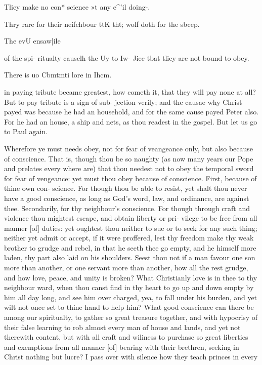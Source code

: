 \documentclass{custom}
\begin{document}
{Tliey make 
no con* 
science »t 
any e^'il 
doing-. 

Thry rare 
for their 
neifchbour 
ttK tht; wolf 
doth for 
the sbcep. 

The evU 
ensaw|ile 

of the spi- 
ritualty 
causclh the 
Uy to Iw- 
Jie\-e tbat 
tliey arc 
not bound 
to obey. 

There is uo 
Cbmtmti 
lore in 
Ihcm. 

in paying tribute became greatest, how cometh it, that they 
will pay none at all? But to pay tribute is a sign of sub- 
jection verily; and the causae why Christ payed was because 
he had an household, and for the same cause payed Peter 
also. For he had an house, a ship and nets, as thou readest 
in the gospel. But let us go to Paul again. 

Wherefore ye must needs obey, not for fear of veangeance 
only, but also because of conscience. That is, though 
thou be so naughty (as now many years our Pope and 
prelates every where are) that thou needest not to obey the 
temporal sword for fear of vengeance: yet must thou obey 
because of conscience. First, because of thine own con- 
science. For though thou be able to resist, yet shalt thou 
never have a good conscience, as long as God's word, law,
and ordinance, are against thee. Secondarily, for thy 
neighbour's conscience. For though through craft and 
violence thou mightest escape, and obtain liberty or pri- 
vilege to be free from all manner [of] duties: yet oughtest 
thou neither to sue or to seek for any such thing; neither 
yet admit or accept, if it were proffered, lest thy freedom 
make thy weak brother to grudge and rebel, in that he 
seeth thee go empty, and he himself more laden, thy part 
also laid on his shoulders. Seest thou not if a man favour 
one son more than another, or one servant more than 
another, how all the rest grudge, and how love, peace, and 
unity is broken? What Christianly love is in thee to thy 
neighbour ward, when thou canst find in thy heart to go 
up and down empty by him all day long, and see him over 
charged, yea, to fall under his burden, and yet wilt not 
once set to thine hand to help him? What good conscience 
can there be among our spiritualty, to gather so great 
treasure together, and with hypocrisy of their false learning 
to rob almost every man of house and lands, and yet not 
therewith content, but with all craft and wiliness to purchase 
so great liberties and exemptions from all manner [of] bearing 
with their brethren, seeking in Christ nothing but lucre?
I pass over with silence how they teach princes in every 


}
\end{document}
